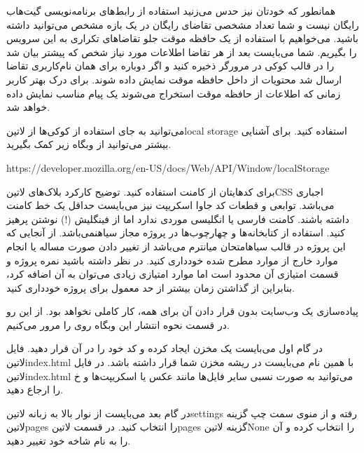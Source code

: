 
همانطور که خودتان نیز حدس می‌زنید استفاده از رابط‌های برنامه‌نویسی گیت‌هاب رایگان نیست و شما تعداد مشخصی تقاضای رایگان در یک بازه مشخص می‌توانید داشته
باشید. می‌خواهیم با استفاده از یک حافظه موقت جلو تقاضاهای تکراری به این سرویس را بگیریم. شما می‌بایست بعد از هر تقاضا اطلاعات مورد نیاز شخص که پیشتر
بیان شد را در قالب کوکی در مرورگر ذخیره کنید و اگر دوباره برای همان نام‌کاربری تقاضا ارسال شد محتویات از داخل حافظه موقت نمایش داده شوند.
برای درک بهتر کاربر زمانی که اطلاعات از حافظه موقت استخراج می‌شوند یک پیام مناسب نمایش داده خواهد شد.

می‌توانید به جای استفاده از کوکی‌ها از ‌لاتین{local storage} استفاده کنید. برای آشنایی بیشتر می‌توانید از وبگاه زیر کمک بگیرید.


\begin{latin}\begin{center}
https://developer.mozilla.org/en-US/docs/Web/API/Window/localStorage
\end{center}\end{latin}



     برای کدهایتان از کامنت استفاده کنید. توضیح کارکرد بلاک‌های ‌لاتین{CSS} اجباری می‌باشد. توابعی و قطعات کد جاوا اسکریپت نیز می‌بایست حداقل یک خط کامنت داشته باشند.
     کامنت فارسی یا انگلیسی موردی ندارد اما از فینگلیش (!) نوشتن پرهیز کنید.
     استفاده از کتابخانه‌ها و چهارچوب‌ها در پروژه مجاز ‌سیاه{نمی‌باشد}.
     از آنجایی که این پروژه در قالب ‌سیاه{امتحان میانترم} می‌باشد از تغییر دادن صورت مساله یا انجام موارد خارج از موارد مطرح شده خودداری کنید.
     در نظر داشته باشید نمره پروژه و قسمت امتیازی آن محدود است اما موارد امتیازی زیادی می‌توان به آن اضافه کرد، بنابراین از گذاشتن زمان بیشتر از حد معمول برای پروژه خودداری کنید.

پیاده‌سازی یک وب‌سایت بدون قرار دادن آن برای همه، کار کاملی نخواهد بود. از این رو در قسمت نحوه انتشار این وبگاه روی  را مرور می‌کنیم.

در گام اول می‌بایست یک مخزن ایجاد کرده و کد خود را در آن قرار دهید. فایل ‌لاتین{index.html} با همین نام می‌بایست در ریشه مخزن شما قرار داشته باشد.
در فایل ‌لاتین{index.html} می‌توانید به صورت نسبی سایر فایل‌ها مانند عکس یا اسکریپت‌ها و ‌خ را ارجاع دهید.

در گام بعد می‌بایست از نوار بالا به زبانه ‌لاتین{settings} رفته و از منوی سمت چپ گزینه ‌لاتین{pages} را انتخاب کنید.
در قسمت ‌لاتین{pages} گزینه ‌لاتین{None} را انتخاب کرده و آن را به نام شاخه خود تغییر دهید.

